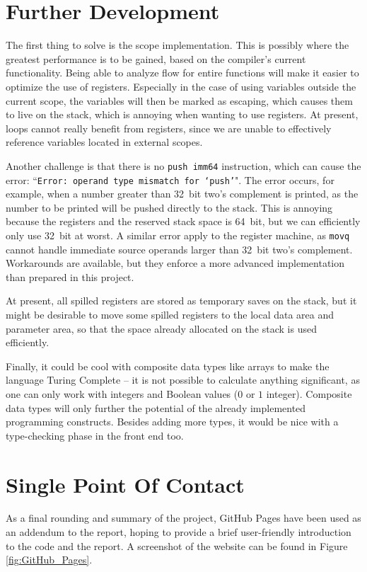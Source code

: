 \section{Further Development}
The first thing to solve is the scope implementation. This is possibly where the greatest performance is to be gained, based on the compiler's current functionality. Being able to analyze flow for entire functions will make it easier to optimize the use of registers. Especially in the case of using variables outside the current scope, the variables will then be marked as escaping, which causes them to live on the stack, which is annoying when wanting to use registers. At present, loops cannot really benefit from registers, since we are unable to effectively reference variables located in external scopes.

Another challenge is that there is no \texttt{push imm64} instruction, which can cause the error: ``\texttt{Error: operand type mismatch for `push'}". The error occurs, for example, when a number greater than \SI{32}{bit} two's complement is printed, as the number to be printed will be pushed directly to the stack. This is annoying because the registers and the reserved stack space is \SI{64}{bit}, but we can efficiently only use \SI{32}{bit} at worst. A similar error apply to the register machine, as \texttt{movq} cannot handle immediate source operands larger than \SI{32}{bit} two's complement. Workarounds are available, but they enforce a more advanced implementation than prepared in this project. 

At present, all spilled registers are stored as temporary saves on the stack, but it might be desirable to move some spilled registers to the local data area and parameter area, so that the space already allocated on the stack is used efficiently.

Finally, it could be cool with composite data types like arrays to make the language Turing Complete -- it is not possible to calculate anything significant, as one can only work with integers and Boolean values ($0$ or $1$ integer). Composite data types will only further the potential of the already implemented programming constructs. Besides adding more types, it would be nice with a type-checking phase in the front end too.


\section{Single Point Of Contact}
As a final rounding and summary of the project, GitHub Pages have been used as an addendum to the report, hoping to provide a brief user-friendly introduction to the code and the report. A screenshot of the website can be found in Figure \ref{fig:GitHub_Pages}.

